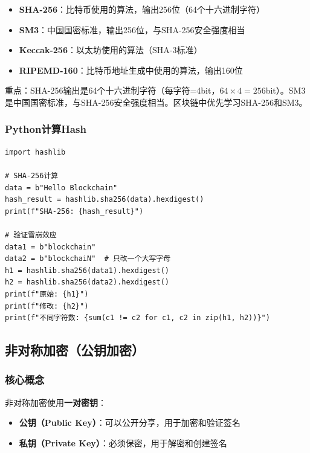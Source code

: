 ﻿\documentclass[12pt,a4paper]{article}
\begin{document}
\begin{itemize}[leftmargin=1.5em]
\item \textbf{SHA-256}：比特币使用的算法，输出256位（64个十六进制字符）
\item \textbf{SM3}：中国国密标准，输出256位，与SHA-256安全强度相当
\item \textbf{Keccak-256}：以太坊使用的算法（SHA-3标准）
\item \textbf{RIPEMD-160}：比特币地址生成中使用的算法，输出160位
\end{itemize}

\begin{keypointbox}
重点：SHA-256输出是64个十六进制字符（每字符=4bit，$64\times4=256$bit）。SM3是中国国密标准，与SHA-256安全强度相当。区块链中优先学习SHA-256和SM3。
\end{keypointbox}

\subsubsection{Python计算Hash}

\begin{lstlisting}
import hashlib

# SHA-256计算
data = b"Hello Blockchain"
hash_result = hashlib.sha256(data).hexdigest()
print(f"SHA-256: {hash_result}")

# 验证雪崩效应
data1 = b"blockchain"
data2 = b"blockchaiN"  # 只改一个大写字母
h1 = hashlib.sha256(data1).hexdigest()
h2 = hashlib.sha256(data2).hexdigest()
print(f"原始: {h1}")
print(f"修改: {h2}")
print(f"不同字符数: {sum(c1 != c2 for c1, c2 in zip(h1, h2))}")
\end{lstlisting}

\subsection{非对称加密（公钥加密）}

\subsubsection{核心概念}

非对称加密使用\textbf{一对密钥}：
\begin{itemize}[leftmargin=1.5em]
\item \textbf{公钥（Public Key）}：可以公开分享，用于加密和验证签名
\item \textbf{私钥（Private Key）}：必须保密，用于解密和创建签名
\end{itemize}
\end{document}
